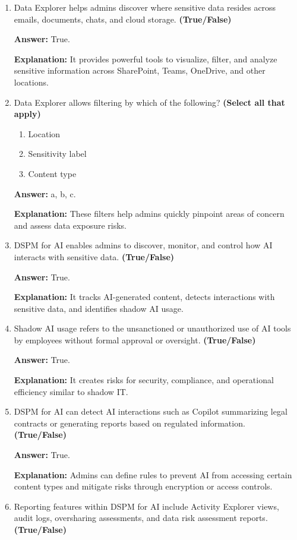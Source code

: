 \documentclass[10pt]{article}
\begin{document}
\begin{enumerate}[leftmargin=*]
\item Data Explorer helps admins discover where sensitive data resides across emails, documents, chats, and cloud storage. \textbf{(True/False)}

\textbf{Answer:} True.

\textbf{Explanation:} It provides powerful tools to visualize, filter, and analyze sensitive information across SharePoint, Teams, OneDrive, and other locations.

\item Data Explorer allows filtering by which of the following? \textbf{(Select all that apply)}
\begin{enumerate}[label=\alph*., leftmargin=1.5em]
\item Location
\item Sensitivity label
\item Content type
\end{enumerate}
\textbf{Answer:} a, b, c.

\textbf{Explanation:} These filters help admins quickly pinpoint areas of concern and assess data exposure risks.

\item DSPM for AI enables admins to discover, monitor, and control how AI interacts with sensitive data. \textbf{(True/False)}

\textbf{Answer:} True.

\textbf{Explanation:} It tracks AI-generated content, detects interactions with sensitive data, and identifies shadow AI usage.

\item Shadow AI usage refers to the unsanctioned or unauthorized use of AI tools by employees without formal approval or oversight. \textbf{(True/False)}

\textbf{Answer:} True.

\textbf{Explanation:} It creates risks for security, compliance, and operational efficiency similar to shadow IT.

\item DSPM for AI can detect AI interactions such as Copilot summarizing legal contracts or generating reports based on regulated information. \textbf{(True/False)}

\textbf{Answer:} True.

\textbf{Explanation:} Admins can define rules to prevent AI from accessing certain content types and mitigate risks through encryption or access controls.

\item Reporting features within DSPM for AI include Activity Explorer views, audit logs, oversharing assessments, and data risk assessment reports. \textbf{(True/False)}


\end{enumerate}
\end{document}

